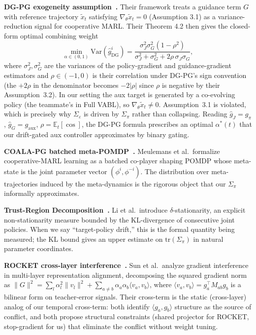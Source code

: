 \documentclass{article}
\theoremstyle{plain}
\theoremstyle{definition}
\theoremstyle{remark}
\begin{document}
\textbf{DG-PG exogeneity assumption~\cite{yang2026dgpg}.} Their
framework treats a guidance term $G$ with reference trajectory
$\tilde{x}_t$ satisfying $\nabla_\theta \tilde{x}_t = 0$
(Assumption 3.1) as a variance-reduction signal for cooperative
MARL. Their Theorem 4.2 then gives the closed-form optimal
combining weight
\begin{equation}
    \min_{\alpha \in (0,1)} \mathrm{Var}(\hat{g}^i_{\mathrm{DG}})
    = \frac{\sigma_J^2 \sigma_G^2 (1 - \rho^2)}
           {\sigma_J^2 + \sigma_G^2 + 2\rho\,\sigma_J\sigma_G},
\end{equation}
where $\sigma_J^2, \sigma_G^2$ are the variances of the
policy-gradient and guidance-gradient estimators and $\rho \in (-1, 0)$
is their correlation under DG-PG's sign convention (the $+2\rho$ in
the denominator becomes $-2|\rho|$ since $\rho$ is negative by
their Assumption~3.2). In our setting the aux target is generated by a
co-evolving policy (the teammate's in Full VABL), so
$\nabla_\theta \tilde{x}_t \neq 0$. Assumption~3.1 is violated,
which is precisely why $\Sigma_\varepsilon$ is driven by
$\Sigma_\pi$ rather than collapsing. Reading $\hat{g}_J = g_\pi$,
$\hat{g}_G = g_{\mathrm{aux}}$, $\rho = \mathbb{E}_t[\cos]$, the
DG-PG formula prescribes an optimal $\alpha^*(t)$ that our
drift-gated aux controller approximates by binary gating.

\textbf{COALA-PG batched meta-POMDP~\cite{meulemans2024coala}.}
Meulemans et al.\ formalize cooperative-MARL learning as a
batched co-player shaping POMDP whose meta-state is the joint
parameter vector $(\phi^i, \phi^{-i})$. The distribution over
meta-trajectories induced by the meta-dynamics is the rigorous
object that our $\Sigma_\pi$ informally approximates.

\textbf{Trust-Region Decomposition~\cite{li2022trustregion}.} Li
et al.\ introduce $\delta$-stationarity, an explicit
non-stationarity measure bounded by the KL-divergence of
consecutive joint policies. When we say ``target-policy drift,''
this is the formal quantity being measured; the KL bound gives an
upper estimate on $\mathrm{tr}(\Sigma_\pi)$ in natural parameter
coordinates.

\textbf{ROCKET cross-layer interference~\cite{sun2026rocket}.} Sun
et al.\ analyze gradient interference in multi-layer representation
alignment, decomposing the squared gradient norm as
$\|G\|^2 = \sum_l \alpha_l^2 \|v_l\|^2 +
\sum_{a \neq b} \alpha_a \alpha_b \langle v_a, v_b \rangle$, where
$\langle v_a, v_b \rangle = g_a^\top M_{ab} g_b$ is a bilinear
form on teacher-error signals. Their cross-term is the
static (cross-layer) analog of our temporal cross-term: both
identify $\langle g_a, g_b \rangle$ structure as the source of
conflict, and both propose structural constraints (shared projector
for ROCKET, stop-gradient for us) that eliminate the conflict
without weight tuning.
\end{document}
